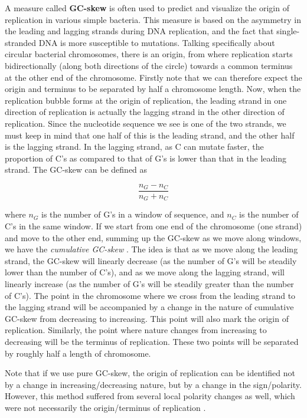 \documentclass[10pt]{article}
\begin{document}
A measure called \textbf{GC-skew} is often used to predict and visualize the origin of replication in various simple bacteria. This measure is based on the asymmetry in the leading and lagging strands during DNA replication, and the fact that single-stranded DNA is more susceptible to mutations. Talking specifically about circular bacterial chromosomes, there is an origin, from where replication starts bidirectionally (along both directions of the circle) towards a common terminus at the other end of the chromosome. Firstly note that we can therefore expect the origin and terminus to be separated by half a chromosome length. Now, when the replication bubble forms at the origin of replication, the leading strand in one direction of replication is actually the lagging strand in the other direction of replication. Since the nucleotide sequence we see is one of the two strands, we must keep in mind that one half of this is the leading strand, and the other half is the lagging strand. In the lagging strand, as C can mutate faster, the proportion of C's as compared to that of G's is lower than that in the leading strand. The GC-skew can be defined as

\begin{equation}
	\frac{n_G-n_C}{n_G+n_C}
\end{equation}

where $n_G$ is the number of G's in a window of sequence, and $n_C$ is the number of C's in the same window. If we start from one end of the chromosome (one strand) and move to the other end, summing up the GC-skew as we move along windows, we have the \textit{cumulative GC-skew} \cite{cumskew}. The idea is that as we move along the leading strand, the GC-skew will linearly decrease (as the number of G's will be steadily lower than the number of C's), and as we move along the lagging strand, will linearly increase (as the number of G's will be steadily greater than the number of C's). The point in the chromosome where we cross from the leading strand to the lagging strand will be accompanied by a change in the nature of cumulative GC-skew from decreasing to increasing. This point will also mark the origin of replication. Similarly, the point where nature changes from increasing to decreasing will be the terminus of replication. These two points will be separated by roughly half a length of chromosome.

Note that if we use pure GC-skew, the origin of replication can be identified not by a change in increasing/decreasing nature, but by a change in the sign/polarity. However, this method suffered from several local polarity changes as well, which were not necessarily the origin/terminus of replication \cite{cumskew}.
\end{document}
